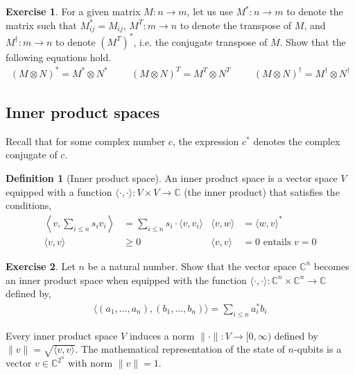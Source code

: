 \documentclass[a4paper, 11pt]{article}
\newcommand{\complex}{\mathbb{C}}
\theoremstyle{definition}
\newtheorem{definition}{Definition}
\newtheorem{exercise}{Exercise}
\begin{document}
\begin{exercise}
  For a given matrix $M : n \to m$, let us use $M^\ast : n \to m$ to
  denote the matrix such that $M_{ij}^\ast = M_{ij}$, $M^T : m \to n$
  to denote the transpose of $M$, and $M^\dagger : m \to n$ to denote
  $(M^T)^\ast$, i.e. the conjugate transpose of $M$. Show that the
  following equations hold.
  \begin{align*}
    (M \otimes N)^\ast = M^\ast \otimes N^\ast \hspace{1cm}
    (M \otimes N)^T = M^T \otimes N^T \hspace{1cm}
    (M \otimes N)^\dagger = M^\dagger \otimes N^\dagger
  \end{align*}
\end{exercise}


\subsection{Inner product spaces}

Recall that for some complex number $c$, the expression $c^\ast$
denotes the complex conjugate of $c$.

\begin{definition}[Inner product space] An inner product space is a
  vector space $V$ equipped with a function
  $\langle \cdot,\cdot \rangle : V \times V \to \complex$ (the inner
  product) that satisfies the conditions,
  \begin{align*}
    \left \langle v, \sum_{i \leq n} s_i v_i \right \rangle
    & = \sum_{i \leq n} s_i \cdot \langle v,v_i \rangle
    & \langle v,w \rangle  & = \langle w,v \rangle^\ast \\
    \langle v,v \rangle & \geq 0 & 
    \langle v,v \rangle & = 0 \text{ entails } v = 0
  \end{align*}
\end{definition}

\begin{exercise}
  Let $n$ be a natural number.  Show that the vector space
  $\complex^n$ becomes an inner product space when equipped with the
  function $\langle \cdot, \cdot \rangle
  : \complex^n \times \complex^n \to \complex$
  defined by,
  \begin{align*}
   \langle (a_1,\dots,a_n),(b_1,\dots,b_n) \rangle = \sum_{i \leq n} a_i^\ast b_i 
  \end{align*}
\end{exercise}

Every inner product space $V$ induces a norm
$\| \cdot \| : V \to [0,\infty)$ defined by
$\| v \| = \sqrt{\langle v,v \rangle}$. The mathematical
representation of the state of $n$-qubits is a vector $v \in \complex^{2^n}$
with norm $\| v \| = 1$.
\end{document}
